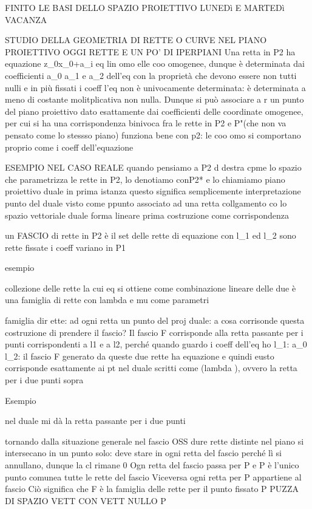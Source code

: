 FINITO LE BASI DELLO SPAZIO PROIETTIVO
LUNEDì E MARTEDì VACANZA



STUDIO DELLA GEOMETRIA DI RETTE O CURVE NEL PIANO PROIETTIVO
OGGI RETTE E UN PO' DI IPERPIANI
Una retta in P2 ha equazione z_0x_0+a_i   eq lin omo elle coo omogenee, dunque è determinata dai coefficienti a_0 a_1 e a_2 dell'eq con la proprietà che devono essere non tutti nulli e in più fissati i coeff l'eq non è univocamente determinata: è determinata a meno di costante molitplicativa non nulla. Dunque si può associare a r un punto del piano proiettivo dato esattamente dai coefficienti delle coordinate omogenee, per cui si ha una corrispondenza binivoca fra le rette in P2 e P"(che non va pensato come lo stessso piano)   funziona bene con p2: le coo omo si comportano proprio come i coeff dell'equazione

ESEMPIO NEL CASO REALE
quando pensiamo a P2 d destra cpme lo spazio che parametrizza le rette in P2, lo denotiamo conP2* e lo chiamiamo piano proiettivo duale
in prima istanza questo significa semplicemente  interpretazione punto del duale visto come ppunto associato ad una retta
collgamento co lo spazio vettoriale duale        forma lineare
prima costruzione come corrispondenza

un FASCIO  di rette in P2 è il set delle rette di equazione    con l_1 ed l_2 sono rette fissate
i coeff variano in P1

esempio

collezione delle rette la cui eq si ottiene come combinazione lineare delle due
è una famiglia di rette con lambda e mu come parametri


famiglia dir ette: ad ogni retta un punto del proj duale: a cosa corrisonde questa costruzione di prendere il fascio?  Il fascio F corrisponde alla retta passante per i punti corrispondenti a l1 e a l2, perché quando guardo i coeff dell'eq ho l_1: a_0    \squigglyarrow  l_2:      il fascio F generato da queste due rette ha equazione e quindi eusto corrisponde esattamente ai pt nel duale scritti come (lambda    ), ovvero la retta per i due punti sopra

Esempio



nel duale mi dà la retta passante per i due punti


tornando dalla situazione generale nel fascio
OSS dure rette distinte nel piano si intersecano in un punto solo: deve stare in ogni retta del fascio perché lì si annullano, dunque la cl rimane 0
Ogn retta del fascio passa per P e P è l'unico punto comunea tutte le rette del fascio
Viceversa ogni retta per P appartiene al fascio
Ciò significa che F è la famiglia delle rette per il punto fissato P PUZZA DI SPAZIO VETT CON VETT NULLO P 

